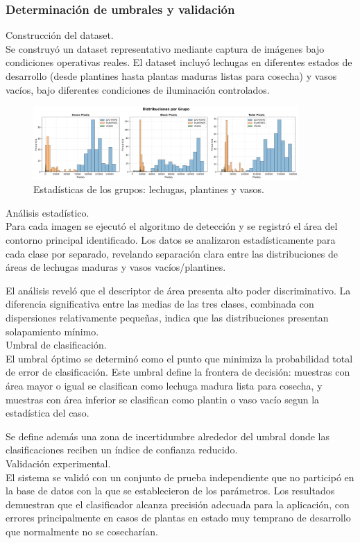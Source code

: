 \subsubsection{Determinación de umbrales y validación}

Construcción del dataset.\\
\noindent
Se construyó un dataset representativo mediante captura de imágenes bajo condiciones operativas reales. El dataset incluyó lechugas en diferentes estados de desarrollo (desde plantines hasta plantas maduras listas para cosecha) y vasos vacíos, bajo diferentes condiciones de iluminación controlados.

\begin{figure}[H]
    \centering
    \includegraphics[width=0.9\textwidth]{img/distribuciones.png}
    \caption{Estadísticas de los grupos: lechugas, plantines y vasos.}
    \label{fig:distribuciones}
\end{figure}

Análisis estadístico.\\
\noindent
Para cada imagen se ejecutó el algoritmo de detección y se registró el área del contorno principal identificado. Los datos se analizaron estadísticamente para cada clase por separado, revelando separación clara entre las distribuciones de áreas de lechugas maduras y vasos vacíos/plantines.

El análisis reveló que el descriptor de área presenta alto poder discriminativo. La diferencia significativa entre las medias de las tres clases, combinada con dispersiones relativamente pequeñas, indica que las distribuciones presentan solapamiento mínimo.\\

Umbral de clasificación.\\
\noindent
El umbral óptimo se determinó como el punto que minimiza la probabilidad total de error de clasificación. Este umbral define la frontera de decisión: muestras con área mayor o igual se clasifican como lechuga madura lista para cosecha, y muestras con área inferior se clasifican como plantin o vaso vacío segun la estadística del caso.

Se define además una zona de incertidumbre alrededor del umbral donde las clasificaciones reciben un índice de confianza reducido.\\

Validación experimental.\\
\noindent
El sistema se validó con un conjunto de prueba independiente que no participó en la base de datos con la que se establecieron de los parámetros. Los resultados demuestran que el clasificador alcanza precisión adecuada para la aplicación, con errores principalmente en casos de plantas en estado muy temprano de desarrollo que normalmente no se cosecharían.

